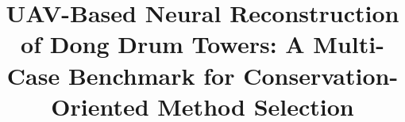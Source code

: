 \documentclass[journal,onecolumn,11pt]{IEEEtran}
\begin{document}
\title{UAV-Based Neural Reconstruction of Dong Drum Towers: A Multi-Case Benchmark for Conservation-Oriented Method Selection}

\author{
}

\maketitle












\nocite{*}


\end{document}
